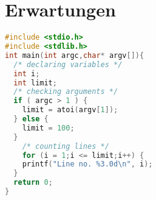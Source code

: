 \documentclass[../main.tex]{subfiles}
\begin{document}
\section{Erwartungen}

\begin{lstlisting}[name=Test,
                   language=C]
#include <stdio.h>
#include <stdlib.h>
int main(int argc,char* argv[]){
  /* declaring variables */
  int i;
  int limit;
  /* checking arguments */
  if ( argc > 1 ) {
    limit = atoi(argv[1]);
  } else {
    limit = 100;
  }
    /* counting lines */
    for (i = 1;i <= limit;i++) {
    printf("Line no. %3.0d\n", i);
  }
  return 0;
}
\end{lstlisting}
\end{document}
